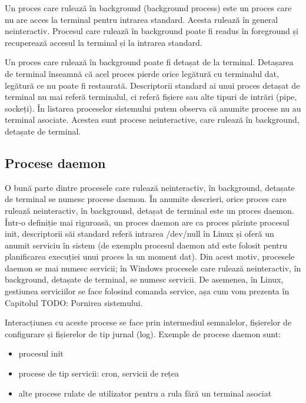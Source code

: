 Un proces care rulează în background (background process) este un proces care nu
are acces la terminal pentru intrarea standard. Acesta rulează în general
neinteractiv. Procesul care rulează în background poate fi readus în foreground
și recuperează accesul la terminal și la intrarea standard.

Un proces care rulează în background poate fi detașat de la terminal. Detașarea
de terminal înseamnă că acel proces pierde orice legătură cu terminalul dat,
legătură ce nu poate fi restaurată. Descriptorii standard ai unui proces detașat
de terminal nu mai referă terminalul, ci referă fișiere sau alte tipuri de
intrări (pipe, sockeți). În listarea proceselor sistemului putem observa că
anumite procese nu au terminal asociate. Acestea sunt procese neinteractive,
care rulează în background, detașate de terminal.

\subsection{Procese daemon}

O bună parte dintre procesele care rulează neinteractiv, în background, detașate
de terminal se numesc procese daemon. În anumite descrieri, orice proces care
rulează neinteractiv, în background, detașat de terminal este un proces daemon.
Într-o definiție mai riguroasă, un proces daemon are ca proces părinte procesul
init, descriptorii săi standard referă intrarea /dev/null în Linux și oferă un
anumit serviciu în sistem (de exemplu procesul daemon atd este folosit pentru
planificarea execuției unui proces la un moment dat). Din acest motiv, procesele
daemon se mai numesc servicii; în Windows procesele care rulează neinteractiv,
în background, detașate de terminal, se numesc servicii. De asemenea, în Linux,
gestiunea serviciilor se face folosind comanda service, așa cum vom prezenta în
Capitolul TODO: Pornirea sistemului.

Interacțiunea cu aceste procese se face prin intermediul semnalelor, fișierelor
de configurare și fișierelor de tip jurnal (log). Exemple de procese daemon
sunt:

\begin{itemize}
	\item procesul init
	\item procese de tip servicii: cron, servicii de rețea
	\item alte procese rulate de utilizator pentru a rula fără un terminal asociat
\end{itemize}

